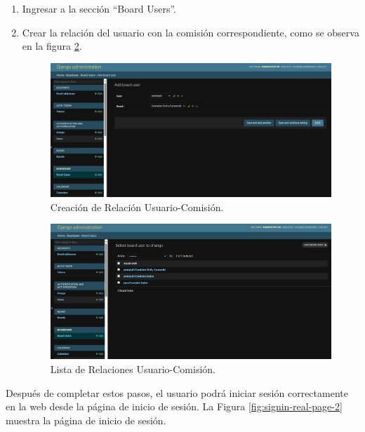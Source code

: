 \begin{enumerate}
    \item Ingresar a la sección ``Board Users''.
    \item Crear la relación del usuario con la comisión correspondiente, como se observa en la figura \ref{fig:board-user-2}.

    \begin{figure}[H]
        \centering
        \includegraphics[width=1\linewidth]{fig/board-user.png}
        \caption{Creación de Relación Usuario-Comisión.}
        \label{fig:board-user-1}
    \end{figure}
    
    \begin{figure}[H]
        \centering
        \includegraphics[width=1\linewidth]{fig/board-user-2.png}
        \caption{Lista de Relaciones Usuario-Comisión.}
        \label{fig:board-user-2}
    \end{figure}
\end{enumerate}

Después de completar estos pasos, el usuario podrá iniciar sesión correctamente en la web desde la página de inicio de sesión. La Figura \ref{fig:signin-real-page-2} muestra la página de inicio de sesión.

